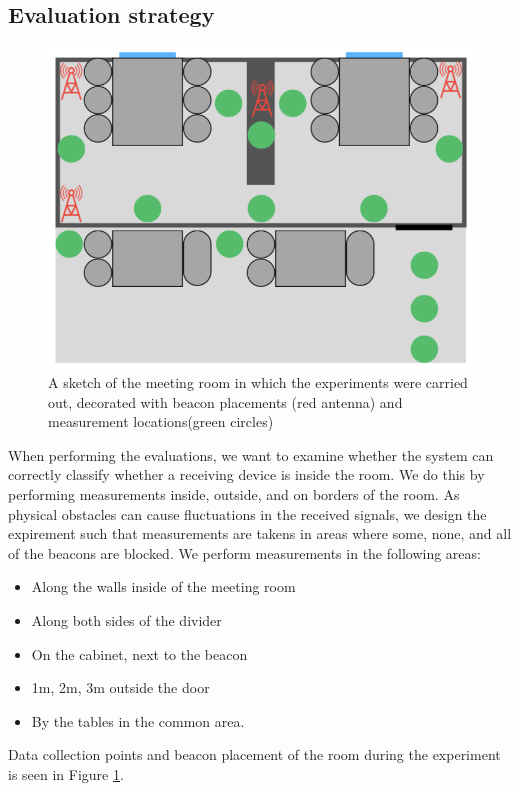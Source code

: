 \subsection{Evaluation strategy}
\begin{figure}[h]
    \centering
    \includegraphics[scale=0.7]{images/experiment_setup.png}
    \caption{A sketch of the meeting room in which the experiments were carried out, decorated with beacon placements (red antenna) and measurement locations(green circles)}
    \label{fig:experiment_setup}
\end{figure}
When performing the evaluations, we want to examine whether the system can correctly classify whether a receiving device is inside the room.
We do this by performing measurements inside, outside, and on borders of the room.
As physical obstacles can cause fluctuations in the received signals, we design the expirement such that measurements are takens in areas where some, none, and all of the beacons are blocked. 
We perform measurements in the following areas:
\begin{itemize}
    \item Along the walls inside of the meeting room
    \item Along both sides of the divider
    \item On the cabinet, next to the beacon
    \item 1m, 2m, 3m outside the door   
    \item By the tables in the common area. 
\end{itemize}
Data collection points and beacon placement of the room during the experiment is seen in Figure \ref{fig:experiment_setup}.


